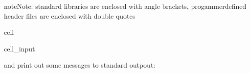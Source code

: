\documentclass[a4paper,10pt,english]{jupyterBook}
\begin{document}
\begin{sphinxadmonition}{note}{Note:}
\sphinxAtStartPar
standard libraries are enclosed with angle brackets, progammer\sphinxhyphen{}defined header files are enclosed with double quotes
\end{sphinxadmonition}

\begin{sphinxuseclass}{cell}\begin{sphinxVerbatimInput}

\begin{sphinxuseclass}{cell_input}
\begin{sphinxVerbatim}[commandchars=\\\{\}]
\end{sphinxVerbatim}

\end{sphinxuseclass}\end{sphinxVerbatimInput}

\end{sphinxuseclass}
\sphinxAtStartPar
and print out some messages to standard outpout:
\end{document}
